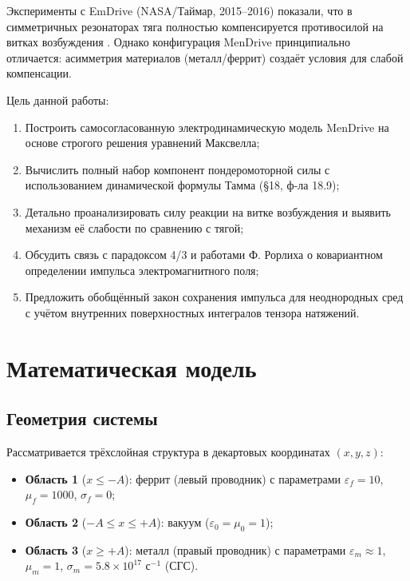\documentclass[a4paper,12pt]{article}
\begin{document}
Эксперименты с EmDrive (NASA/Таймар, 2015--2016) показали, что в симметричных
резонаторах тяга полностью компенсируется противосилой на витках возбуждения
\cite{Tajmar2016}. Однако конфигурация MenDrive принципиально отличается:
асимметрия материалов (металл/феррит) создаёт условия для слабой компенсации.

Цель данной работы:
\begin{enumerate}
    \item Построить самосогласованную электродинамическую модель MenDrive
    на основе строгого решения уравнений Максвелла;
    \item Вычислить полный набор компонент пондеромоторной силы с использованием
    динамической формулы Тамма (\S 18, ф-ла 18.9);
    \item Детально проанализировать силу реакции на витке возбуждения и выявить
    механизм её слабости по сравнению с тягой;
    \item Обсудить связь с парадоксом 4/3 и работами Ф. Рорлиха о ковариантном
    определении импульса электромагнитного поля;
    \item Предложить обобщённый закон сохранения импульса для неоднородных сред
    с учётом внутренних поверхностных интегралов тензора натяжений.
\end{enumerate}

\section{Математическая модель}

\subsection{Геометрия системы}

Рассматривается трёхслойная структура в декартовых координатах $(x, y, z)$:

\begin{itemize}
    \item \textbf{Область 1} ($x \leq -A$): феррит (левый проводник) с параметрами
    $\varepsilon_f = 10$, $\mu_f = 1000$, $\sigma_f = 0$;
    \item \textbf{Область 2} ($-A \leq x \leq +A$): вакуум
    ($\varepsilon_0 = \mu_0 = 1$);
    \item \textbf{Область 3} ($x \geq +A$): металл (правый проводник) с параметрами
    $\varepsilon_m \approx 1$, $\mu_m = 1$, $\sigma_m = 5.8 \times 10^{17}$ с$^{-1}$ (СГС).
\end{itemize}
\end{document}
